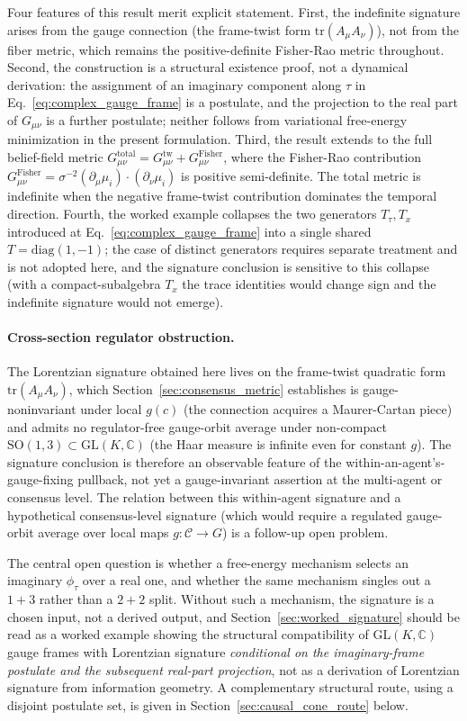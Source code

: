 \documentclass[11pt]{article}
\begin{document}
Four features of this result merit explicit statement. First, the indefinite signature arises from the gauge connection (the frame-twist form $\mathrm{tr}(A_\mu A_\nu)$), not from the fiber metric, which remains the positive-definite Fisher-Rao metric throughout. Second, the construction is a structural existence proof, not a dynamical derivation: the assignment of an imaginary component along $\tau$ in Eq.~\eqref{eq:complex_gauge_frame} is a postulate, and the projection to the real part of $G_{\mu\nu}$ is a further postulate; neither follows from variational free-energy minimization in the present formulation. Third, the result extends to the full belief-field metric $G_{\mu\nu}^{\mathrm{total}} = G_{\mu\nu}^{\mathrm{tw}} + G_{\mu\nu}^{\mathrm{Fisher}}$, where the Fisher-Rao contribution $G_{\mu\nu}^{\mathrm{Fisher}} = \sigma^{-2}(\partial_\mu \mu_i) \cdot (\partial_\nu \mu_i)$ is positive semi-definite. The total metric is indefinite when the negative frame-twist contribution dominates the temporal direction. Fourth, the worked example collapses the two generators $T_\tau, T_x$ introduced at Eq.~\eqref{eq:complex_gauge_frame} into a single shared $T = \mathrm{diag}(1, -1)$; the case of distinct generators requires separate treatment and is not adopted here, and the signature conclusion is sensitive to this collapse (with a compact-subalgebra $T_x$ the trace identities would change sign and the indefinite signature would not emerge).

\paragraph{Cross-section regulator obstruction.}
The Lorentzian signature obtained here lives on the frame-twist quadratic form $\mathrm{tr}(A_\mu A_\nu)$, which Section~\ref{sec:consensus_metric} establishes is gauge-noninvariant under local $g(c)$ (the connection acquires a Maurer-Cartan piece) and admits no regulator-free gauge-orbit average under non-compact $\mathrm{SO}(1,3) \subset \mathrm{GL}(K, \mathbb{C})$ (the Haar measure is infinite even for constant $g$). The signature conclusion is therefore an observable feature of the within-an-agent's-gauge-fixing pullback, not yet a gauge-invariant assertion at the multi-agent or consensus level. The relation between this within-agent signature and a hypothetical consensus-level signature (which would require a regulated gauge-orbit average over local maps $g: \mathcal{C} \to G$) is a follow-up open problem.

The central open question is whether a free-energy mechanism selects an imaginary $\phi_\tau$ over a real one, and whether the same mechanism singles out a $1{+}3$ rather than a $2{+}2$ split. Without such a mechanism, the signature is a chosen input, not a derived output, and Section~\ref{sec:worked_signature} should be read as a worked example showing the structural compatibility of $\mathrm{GL}(K,\mathbb{C})$ gauge frames with Lorentzian signature \emph{conditional on the imaginary-frame postulate and the subsequent real-part projection}, not as a derivation of Lorentzian signature from information geometry. A complementary structural route, using a disjoint postulate set, is given in Section~\ref{sec:causal_cone_route} below.
\end{document}
